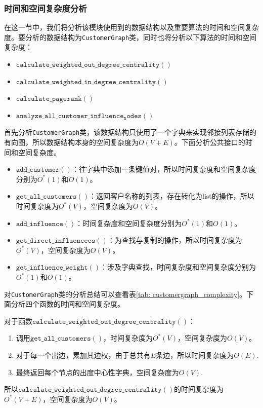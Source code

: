 \documentclass[cn,hazy,blue,10pt,normal]{elegantnote}
\begin{document}
\subsubsection{时间和空间复杂度分析}
在这一节中，我们将分析该模块使用到的数据结构以及重要算法的时间和空间复杂度。要分析的数据结构为\texttt{CustomerGraph}类，同时也将分析以下算法的时间和空间复杂度：
\begin{itemize}
    \item $\mathtt{calculate\_weighted\_out\_degree\_centrality()}$
    \item $\mathtt{calculate\_weighted\_in\_degree\_centrality()}$
    \item $\mathtt{calculate\_pagerank()}$
    \item $\mathtt{analyze\_all\_customer\_influence_nodes()}$
\end{itemize}

首先分析\texttt{CustomerGraph}类，该数据结构只使用了一个字典来实现邻接列表存储的有向图，所以数据结构本身的空间复杂度为$O(V+E)$。下面分析公共接口的时间和空间复杂度。

\begin{itemize}
    \item $\mathtt{add\_customer()}$：往字典中添加一条键值对，所以时间复杂度和空间复杂度分别为$O^*(1)$和$O(1)$。
    \item $\mathtt{get\_all\_customers()}$：返回客户名称的列表，存在转化为list的操作，所以时间复杂度为$O^*(V)$，空间复杂度为$O(V)$。
    \item $\mathtt{add\_influence()}$：时间复杂度和空间复杂度分别为$O^*(1)$和$O(1)$。
    \item $\mathtt{get\_direct\_influencees()}$：为查找与复制的操作，所以时间复杂度为$O^*(V)$，空间复杂度为$O(V)$。
    \item $\mathtt{get\_influence\_weight()}$：涉及字典查找，时间复杂度和空间复杂度分别为$O^*(1)$和$O(1)$。
\end{itemize}

对\texttt{CustomerGraph}类的分析总结可以查看表\ref{tab: customergraph_complexity}。下面分析四个函数的时间和空间复杂度。

对于函数$\mathtt{calculate\_weighted\_out\_degree\_centrality()}$：
\begin{enumerate}
    \item 调用$\mathtt{get\_all\_customers()}$，时间复杂度为$O^*(V)$，空间复杂度为$O(V)$。
    \item 对于每一个出边，累加其边权，由于总共有$E$条边，所以时间复杂度为$O(E)$.
    \item 最终返回每个节点的出度中心性字典，空间复杂度为$O(V)$.
\end{enumerate}
所以$\mathtt{calculate\_weighted\_out\_degree\_centrality()}$的时间复杂度为$O^*(V+E)$，空间复杂度为$O(V)$。
\end{document}
